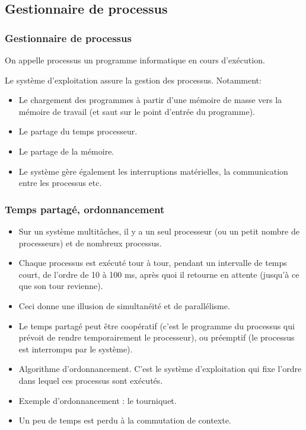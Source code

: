 \documentclass[xcolor=svgnames]{beamer}
\begin{document}
\subsection{Gestionnaire de processus}
\begin{frame}
\frametitle{Gestionnaire de processus}

On appelle \alert{processus} un programme informatique en cours d'exécution. 

\pause
Le système d'exploitation assure la gestion des processus. Notamment:
\begin{itemize}
\item Le chargement des programmes à partir d'une mémoire de masse vers
  la mémoire de travail (et saut sur le point d'entrée du programme). \pause
\item Le partage du temps processeur. \pause
\item Le partage de la mémoire. \pause
\item Le système gère également les interruptions matérielles, la
  communication entre les processus etc.
\end{itemize}
\end{frame}

\begin{frame}
  \frametitle{Temps partagé, ordonnancement}
\pause
\begin{itemize}
\item  Sur un système multitâches, il y a un seul processeur (ou un petit
    nombre de processeurs) et de nombreux processus.
\pause
\item Chaque processus est exécuté tour à tour, pendant un intervalle de
    temps court, de l'ordre de 10 à 100 ms, après quoi il retourne en
    attente (jusqu'à ce que son tour revienne).  
\pause
 \item Ceci donne une illusion de simultanéité et de parallélisme.
\pause
\item Le temps partagé peut être \alert{coopératif} (c'est le programme du
  processus qui prévoit de rendre temporairement le processeur), ou
  \alert{préemptif} (le processus est interrompu par le système).
\pause
  \item  \alert{Algorithme d'ordonnancement}. C'est le système d'exploitation qui fixe l'ordre dans lequel ces
    processus sont exécutés. 
\pause
  \item Exemple d'ordonnancement : le tourniquet.
\pause
  \item Un peu de temps est perdu à la \alert{commutation de
      contexte}.
  \end{itemize}
\end{frame}
\end{document}
